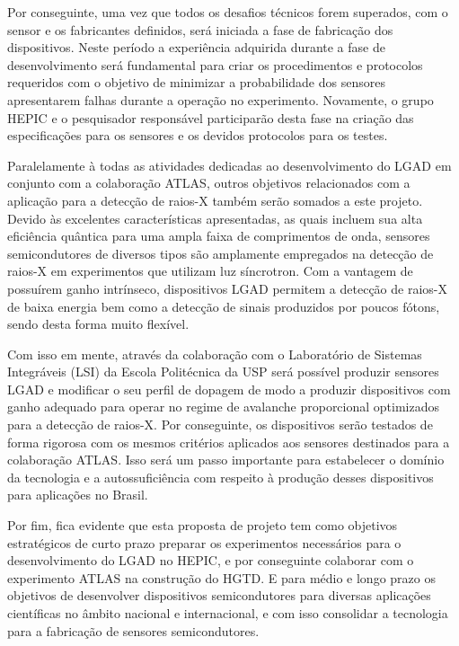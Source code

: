 Por conseguinte, uma vez que todos os desafios técnicos forem superados, com o sensor e os fabricantes definidos, será iniciada a fase de fabricação dos dispositivos. Neste período a experiência adquirida durante a fase de desenvolvimento será fundamental para criar os procedimentos e protocolos requeridos com o objetivo de minimizar a probabilidade dos sensores apresentarem falhas durante a operação no experimento. Novamente, o grupo HEPIC e o pesquisador responsável participarão desta fase na criação das especificações para os sensores e os devidos protocolos para os testes.     

Paralelamente à todas as atividades dedicadas ao desenvolvimento do LGAD em conjunto com a colaboração ATLAS, outros objetivos relacionados com a aplicação para a detecção de raios-X também serão somados a este projeto. Devido às excelentes características apresentadas, as quais incluem sua alta eficiência quântica para uma ampla faixa de comprimentos de onda, sensores semicondutores de diversos tipos são amplamente empregados na detecção de raios-X em experimentos que utilizam luz síncrotron. Com a vantagem de possuírem ganho intrínseco, dispositivos LGAD permitem a detecção de raios-X de baixa energia bem como a detecção de sinais produzidos por poucos fótons, sendo desta forma muito flexível. 

Com isso em mente, através da colaboração com o Laboratório de Sistemas Integráveis (LSI) da Escola Politécnica da USP será possível produzir sensores LGAD e modificar o seu perfil de dopagem de modo a produzir dispositivos com ganho adequado para operar no regime de avalanche proporcional optimizados para a detecção de raios-X. Por conseguinte, os dispositivos serão testados de forma rigorosa com os mesmos critérios aplicados aos sensores destinados para a colaboração ATLAS. Isso será um passo importante para estabelecer o domínio da tecnologia e a autossuficiência com respeito à produção desses dispositivos para aplicações no Brasil.


Por fim, fica evidente que esta proposta de projeto tem como objetivos estratégicos de curto prazo preparar os experimentos necessários para o desenvolvimento do LGAD no HEPIC, e por conseguinte colaborar com o experimento ATLAS na construção do HGTD. E para médio e longo prazo os objetivos de desenvolver dispositivos semicondutores para diversas aplicações científicas no âmbito nacional e internacional, e com isso consolidar a tecnologia para a fabricação de sensores semicondutores.


